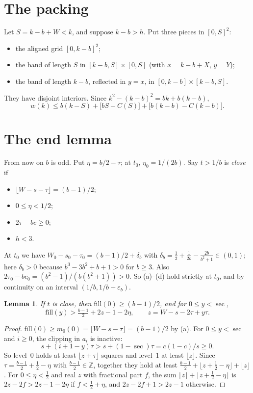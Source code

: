 \documentclass[11pt,letterpaper]{amsart}
\theoremstyle{plain}
\newtheorem{lemma}[theorem]{Lemma}
\theoremstyle{remark}
\newcommand{\fl}[1]{\lfloor #1 \rfloor}
\begin{document}
\section{The packing}

Let $S=k-b+W<k$, and suppose $k-b>h$. Put three pieces in $[0,S]^2$:
\begin{itemize}
\item the aligned grid $[0,k-b]^2$;
\item the band of length $S$ in $[k-b,S]\times[0,S]$ (with $x=k-b+X$, $y=Y$);
\item the band of length $k-b$, reflected in $y=x$, in $[0,k-b]\times[k-b,S]$.
\end{itemize}
They have disjoint interiors. Since $k^2-(k-b)^2=bk+b(k-b)$,
\begin{equation}\label{eq:waste}
w(k)\le b(k-S)+\bigl[bS-C(S)\bigr]+\bigl[b(k-b)-C(k-b)\bigr].
\end{equation}

\section{The end lemma}

From now on $b$ is odd. Put $\eta=b/2-\tau$; at $t_0$, $\eta_0=1/(2b)$. Say $t>1/b$ is \emph{close} if
\begin{itemize}
\item[(a)] $\fl{W-s-\tau}=(b-1)/2$;
\item[(b)] $0\le\eta<1/2$;
\item[(c)] $2\tau-bc\ge0$;
\item[(d)] $h<3$.
\end{itemize}
At $t_0$ we have $W_0-s_0-\tau_0=(b-1)/2+\delta_b$ with $\delta_b=\tfrac12+\tfrac1{2b}-\tfrac{2b}{b^2+1}\in(0,1)$; here $\delta_b>0$ because $b^3-3b^2+b+1>0$ for $b\ge3$. Also $2\tau_0-bc_0=(b^2-1)/(b(b^2+1))>0$. So (a)--(d) hold strictly at $t_0$, and by continuity on an interval $(1/b,1/b+\varepsilon_b)$.

\begin{lemma}\label{lem:fill}
If $t$ is close, then $\mathrm{fill}(0)\ge(b-1)/2$, and for $0\le y<\sec$,
\[
\mathrm{fill}(y)>\tfrac{b-1}{2}+2z-1-2\eta,\qquad z=W-s-2\tau+y\tau.
\]
\end{lemma}

\begin{proof}
$\mathrm{fill}(0)\ge m_0(0)=\fl{W-s-\tau}=(b-1)/2$ by (a). For $0\le y<\sec$ and $i\ge0$, the clipping in $a_i$ is inactive:
\[
s+(i+1-y)\tau>s+(1-\sec)\tau=c(1-c)/s\ge0.
\]
So level~$0$ holds at least $\fl{z+\tau}$ squares and level~$1$ at least $\fl z$. Since $\tau=\frac{b-1}2+\frac12-\eta$ with $\frac{b-1}2\in\mathbb Z$, together they hold at least $\frac{b-1}2+\fl{z+\frac12-\eta}+\fl z$. For $0\le\eta<\frac12$ and real $z$ with fractional part $f$, the sum $\fl z+\fl{z+\frac12-\eta}$ is $2z-2f>2z-1-2\eta$ if $f<\frac12+\eta$, and $2z-2f+1>2z-1$ otherwise.
\end{proof}
\end{document}
